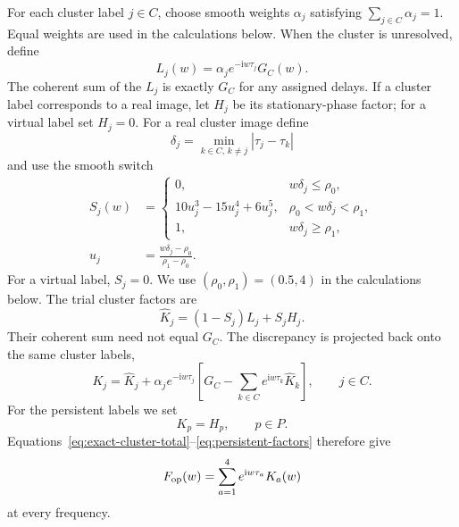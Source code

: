 \documentclass[aps,prd,twocolumn,nofootinbib,superscriptaddress,floatfix]{revtex4-2}
\newcommand{\ii}{\mathrm{i}}
\begin{document}
For each cluster label $j\in C$, choose smooth weights $\alpha_j$ satisfying
$\sum_{j\in C}\alpha_j=1$.  Equal weights are used in the calculations below.
When the cluster is unresolved, define
\begin{equation}
 L_j(w)=\alpha_j e^{-\ii w\tau_j}G_C(w).
 \label{eq:unresolved-cluster-split}
\end{equation}
The coherent sum of the $L_j$ is exactly $G_C$ for any assigned delays.  If a
cluster label corresponds to a real image, let $H_j$ be its stationary-phase
factor; for a virtual label set $H_j=0$.  For a real cluster image define
\begin{equation}
 \delta_j=\min_{k\in C,\,k\ne j}|\tau_j-\tau_k|
 \label{eq:delay-separation}
\end{equation}
and use the smooth switch
\begin{align}
 S_j(w)&=
 \begin{cases}
 0, & w\delta_j\leq\rho_0,\\[1mm]
 10u_j^3-15u_j^4+6u_j^5,
 & \rho_0<w\delta_j<\rho_1,\\[1mm]
 1, & w\delta_j\geq\rho_1,
 \end{cases}
 \label{eq:switch}\\
 u_j&=\frac{w\delta_j-\rho_0}{\rho_1-\rho_0}.
 \label{eq:switch-coordinate}
\end{align}
For a virtual label, $S_j=0$.  We use
$(\rho_0,\rho_1)=(0.5,4)$ in the calculations below.  The trial cluster
factors are
\begin{equation}
 \widehat K_j=(1-S_j)L_j+S_jH_j.
 \label{eq:trial-cluster}
\end{equation}
Their coherent sum need not equal $G_C$.  The discrepancy is projected back
onto the same cluster labels,
\begin{equation}
 \boxed{
 K_j=\widehat K_j+\alpha_j e^{-\ii w\tau_j}
 \left[G_C-\sum_{k\in C}e^{\ii w\tau_k}\widehat K_k\right],
 \qquad j\in C .}
 \label{eq:global-projection}
\end{equation}
For the persistent labels we set
\begin{equation}
 K_p=H_p,\qquad p\in P.
 \label{eq:persistent-factors}
\end{equation}
Equations~\eqref{eq:exact-cluster-total}--\eqref{eq:persistent-factors}
therefore give
\begin{equation}
 F_{\rm op}(w)=\sum_{a=1}^{4}e^{\ii w\tau_a}K_a(w)
 \label{eq:exact-reconstruction}
\end{equation}
at every frequency.
\end{document}
